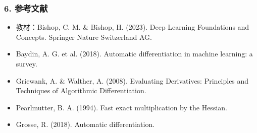 \documentclass[t,aspectratio=169]{beamer} %
\begin{document}
\begin{frame}
    \frametitle{6. 参考文献}
    \begin{itemize}
        \item 教材：Bishop, C. M. \& Bishop, H. (2023). Deep Learning Foundations and Concepts. Springer Nature Switzerland AG.
        \item Baydin, A. G. et al. (2018). Automatic differentiation in machine learning: a survey.
        \item Griewank, A. \& Walther, A. (2008). Evaluating Derivatives: Principles and Techniques of Algorithmic Differentiation.
        \item Pearlmutter, B. A. (1994). Fast exact multiplication by the Hessian.
        \item Grosse, R. (2018). Automatic differentiation.
    \end{itemize}
\end{frame}
\end{document}
